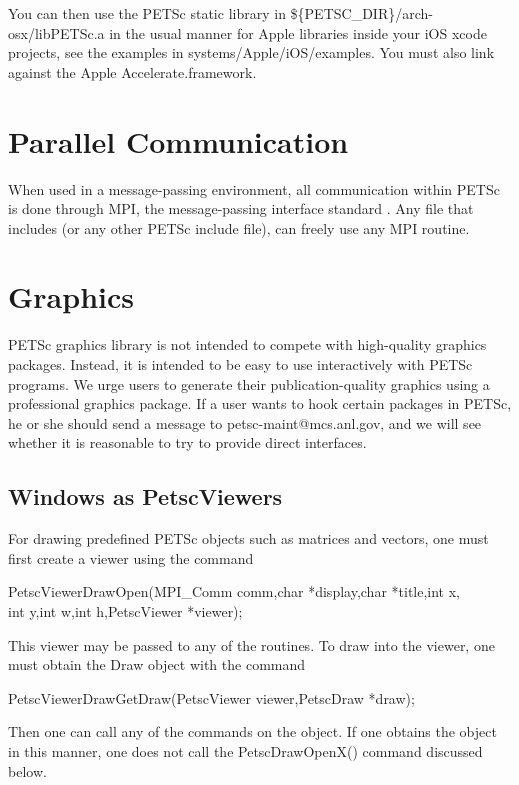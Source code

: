 {{{You can then use the PETSc static library in \$\{PETSC\_DIR\}/arch-osx/libPETSc.a in the usual manner for Apple libraries inside your iOS xcode projects, see the examples in systems/Apple/iOS/examples.  You must also link against the Apple Accelerate.framework.

\section{Parallel Communication}

When used in a message-passing environment, all communication 
within
PETSc is done through MPI, the message-passing interface standard
\cite{MPI-final}.  Any file that includes  (or any other
PETSc include file), can freely use any MPI routine.

\section{Graphics}

PETSc graphics library is not intended to compete with
high-quality graphics packages.  Instead, it is intended to be
easy to use interactively with PETSc programs. We urge users
to generate their publication-quality graphics using a
professional graphics package. If a user wants to hook
certain packages in PETSc, he or she should send a message to
petsc-maint@mcs.anl.gov, and we will see whether it is reasonable
to try to provide direct interfaces.

\subsection{Windows as PetscViewers}
For drawing predefined PETSc objects such as matrices and vectors, one must
first create a viewer using the
command
\begin{tabbing}
  PetscViewerDrawOpen(MPI\_Comm comm,char *display,char *title,int x,\\
                       int y,int w,int h,PetscViewer *viewer);
\end{tabbing}
This viewer may be passed to any of the  routines.
To draw into the viewer, one must obtain the Draw object with the
command
\begin{tabbing}
  PetscViewerDrawGetDraw(PetscViewer viewer,PetscDraw *draw);
\end{tabbing}
Then one can call any of the  commands on the 
object. If one obtains the  object in this manner,
one does not call the PetscDrawOpenX() command discussed below.

}}}
